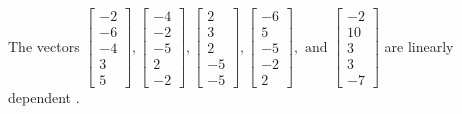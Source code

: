 \begin{exercise}
\begin{exerciseStatement}
  \end{exerciseStatement}
  \begin{exerciseAnswer}
   The vectors \(\left[\begin{array}{r}
-2 \\
-6 \\
-4 \\
3 \\
5
\end{array}\right] , \left[\begin{array}{r}
-4 \\
-2 \\
-5 \\
2 \\
-2
\end{array}\right] , \left[\begin{array}{r}
2 \\
3 \\
2 \\
-5 \\
-5
\end{array}\right] , \left[\begin{array}{r}
-6 \\
5 \\
-5 \\
-2 \\
2
\end{array}\right] , \text{ and } \left[\begin{array}{r}
-2 \\
10 \\
3 \\
3 \\
-7
\end{array}\right]\) are 
  	 linearly dependent  .
  


  \end{exerciseAnswer}
\end{exercise}
